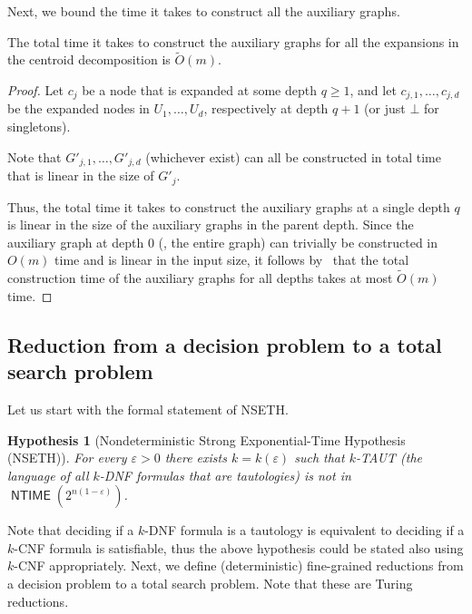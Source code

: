 \documentclass{toc}
\newtheorem{hypothesis}[theorem]{Hypothesis}
\theoremstyle{plain}
\newcommand{\NSETH}{NSETH\xspace}
\DeclareMathOperator{\NTIME}{\mathsf{NTIME}}
\newcommand\tO{\ensuremath{\widetilde O}}  %
\begin{document}
Next, we bound the time it takes to construct all the auxiliary graphs.
\begin{lemma}\label{lemma:construction_time}
The total time it takes to construct the auxiliary graphs for all the expansions in the centroid decomposition is $\tO(m)$.
\end{lemma}

\begin{proof}
Let $c_j$ be a node that is expanded at some depth $q\geq 1$, and let $c_{j,1},\dots,c_{j,d}$ be the expanded nodes in $U_{1},\dots,U_{d}$, respectively at depth $q+1$ (or just $\bot$ for singletons).

Note that $G'_{j,1},\dots,G'_{j,d}$ (whichever exist) can all be constructed in total time that is linear in the size of $G'_j$.

Thus, the total time it takes to construct the auxiliary graphs at a single depth $q$ is linear in the size of the auxiliary graphs in the parent depth. Since the auxiliary graph at depth $0$ (\ie, the entire graph) can trivially be constructed in $O(m)$ time and is linear in the input size, it follows by~ that the total construction time of the auxiliary graphs for all depths takes at most $\tO(m)$ time.
\end{proof}

\subsection{Reduction from a decision problem to a total search problem}\label{subsec:reduction}

Let us start with the formal statement of \NSETH.
\begin{hypothesis}[Nondeterministic Strong Exponential-Time Hypothesis (\NSETH)]
For every $\varepsilon>0$ there exists $k=k(\varepsilon)$ such that $k$-TAUT (the language of all $k$-DNF formulas that are tautologies) is not in $\NTIME(2^{n(1-\varepsilon)})$.
\end{hypothesis}
Note that deciding if a $k$-DNF formula is a tautology is equivalent to deciding if a $k$-CNF formula is satisfiable, thus the above hypothesis could be stated also using $k$-CNF appropriately.
Next, we define (deterministic) fine-grained reductions from a decision problem to a total search problem. Note that these are Turing reductions.
\end{document}
